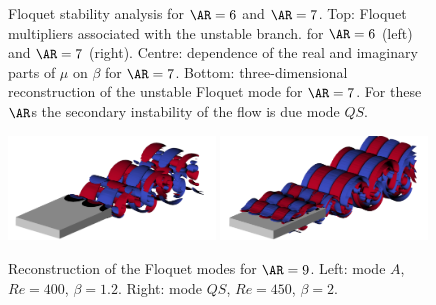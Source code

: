 \begin{figure}
  \caption{Floquet stability analysis for $\AR=6$ and $\AR=7$. Top: Floquet multipliers associated with the unstable branch. for $\AR=6$ (left) and $\AR=7$ (right). Centre: dependence of the real and imaginary parts of $\mu$ on $\beta$ for $\AR=7$. Bottom: three-dimensional reconstruction of the unstable Floquet mode for $\AR=7$. For these $\AR$s the secondary instability of the flow is due mode $QS$.}
  \label{fig:mult_AR7s}
\end{figure}


\begin{figure}
  \centering
  \includegraphics[width=0.49\textwidth]{./fig/AR9s/Floquet_AR9_Re400_beta1p2_modeA.png}  
  \includegraphics[width=0.49\textwidth]{./fig/AR9s/Floquet_AR9_Re450_beta2_modeQS.png}
  \caption{Reconstruction of the Floquet modes for $\AR=9$. Left: mode $A$, $Re=400$, $\beta=1.2$. Right: mode $QS$, $Re=450$, $\beta=2$.}
  \label{fig:mult_AR9s}
\end{figure}

